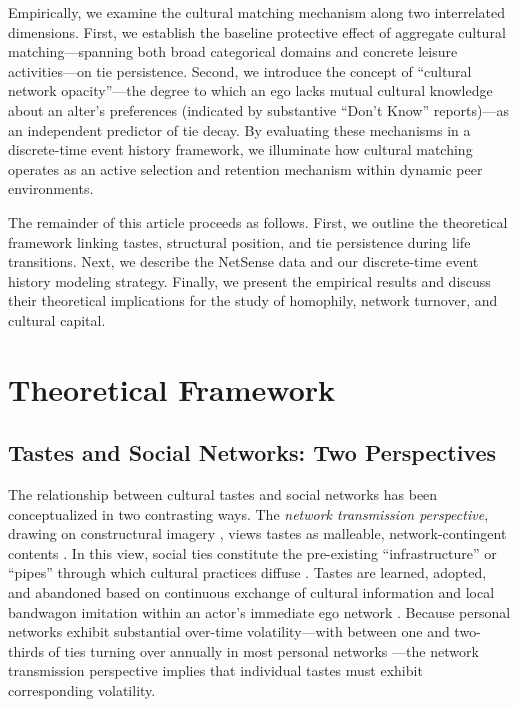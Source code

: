 \documentclass[
  letterpaper,
  DIV=11,
  numbers=noendperiod]{scrartcl}
\begin{document}
Empirically, we examine the cultural matching mechanism along two interrelated dimensions. First, we establish the baseline protective effect of aggregate cultural matching—spanning both broad categorical domains and concrete leisure activities—on tie persistence. Second, we introduce the concept of ``cultural network opacity''---the degree to which an ego lacks mutual cultural knowledge about an alter's preferences (indicated by substantive ``Don't Know'' reports)---as an independent predictor of tie decay. By evaluating these mechanisms in a discrete-time event history framework, we illuminate how cultural matching operates as an active selection and retention mechanism within dynamic peer environments.

The remainder of this article proceeds as follows. First, we outline the theoretical framework linking tastes, structural position, and tie persistence during life transitions. Next, we describe the NetSense data and our discrete-time event history modeling strategy. Finally, we present the empirical results and discuss their theoretical implications for the study of homophily, network turnover, and cultural capital.

\section{Theoretical Framework}\label{theoretical-framework}

\subsection{Tastes and Social Networks: Two Perspectives}\label{tastes-and-social-networks-two-perspectives}

The relationship between cultural tastes and social networks has been conceptualized in two contrasting ways. The \textit{network transmission perspective}, drawing on constructural imagery \citep{carley1991}, views tastes as malleable, network-contingent contents \citep{erickson1988, erickson1996, mark1998a, mark2003}. In this view, social ties constitute the pre-existing ``infrastructure'' or ``pipes'' through which cultural practices diffuse \citep{borgatti2005, erickson1996}. Tastes are learned, adopted, and abandoned based on continuous exchange of cultural information and local bandwagon imitation within an actor's immediate ego network \citep{mark2003}. Because personal networks exhibit substantial over-time volatility---with between one and two-thirds of ties turning over annually in most personal networks \citep{morgan1997, suitor1997}---the network transmission perspective implies that individual tastes must exhibit corresponding volatility.
\end{document}
